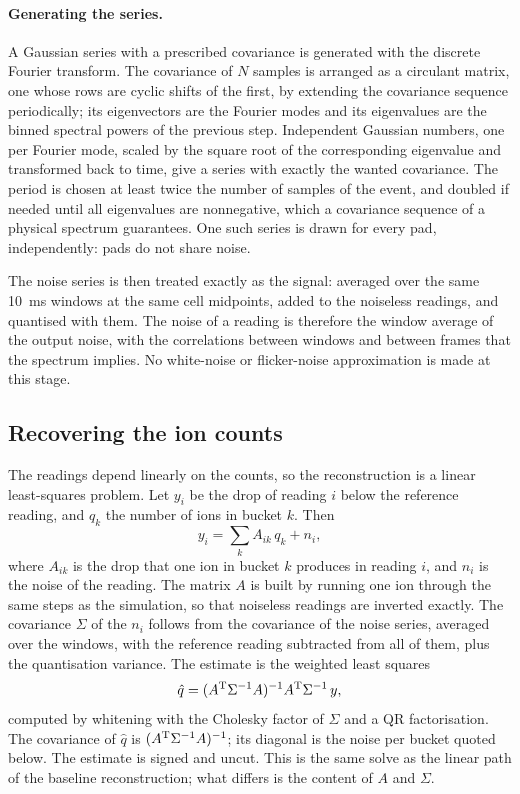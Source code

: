 \documentclass[11pt,a4paper]{article}
\begin{document}
\paragraph{Generating the series.} A Gaussian series with a prescribed
covariance is generated with the discrete Fourier transform. The covariance
of $N$ samples is arranged as a circulant matrix, one whose rows are cyclic
shifts of the first, by extending the covariance sequence periodically; its
eigenvectors are the Fourier modes and its eigenvalues are the binned
spectral powers of the previous step. Independent Gaussian numbers, one per
Fourier mode, scaled by the square root of the corresponding eigenvalue and
transformed back to time, give a series with exactly the wanted covariance.
The period is chosen at least twice the number of samples of the event, and
doubled if needed until all eigenvalues are nonnegative, which a covariance
sequence of a physical spectrum guarantees. One such series is drawn for
every pad, independently: pads do not share noise.

The noise series is then treated exactly as the signal: averaged over the
same \SI{10}{ms} windows at the same cell midpoints, added to the noiseless
readings, and quantised with them. The noise of a reading is therefore the
window average of the output noise, with the correlations between windows
and between frames that the spectrum implies. No white-noise or
flicker-noise approximation is made at this stage.

\subsection{Recovering the ion counts}
\label{sec:vh1reco}
%
The readings depend linearly on the counts, so the reconstruction is a
linear least-squares problem. Let $y_i$ be the drop of reading $i$ below the
reference reading, and $q_k$ the number of ions in bucket $k$. Then
\[
 y_i = \sum_k A_{ik}\,q_k + n_i ,
\]
where $A_{ik}$ is the drop that one ion in bucket $k$ produces in reading
$i$, and $n_i$ is the noise of the reading. The matrix $A$ is built by
running one ion through the same steps as the simulation, so that noiseless
readings are inverted exactly. The covariance $\Sigma$ of the $n_i$ follows
from the covariance of the noise series, averaged over the windows, with the
reference reading subtracted from all of them, plus the quantisation
variance. The estimate is the weighted least squares
\[
 \hat q = (A^{\rm T}\Sigma^{-1}A)^{-1}A^{\rm T}\Sigma^{-1}\,y ,
\]
computed by whitening with the Cholesky factor of $\Sigma$ and a QR
factorisation. The covariance of $\hat q$ is $(A^{\rm T}\Sigma^{-1}A)^{-1}$;
its diagonal is the noise per bucket quoted below. The estimate is signed
and uncut. This is the same solve as the linear path of the baseline
reconstruction; what differs is the content of $A$ and $\Sigma$.
\end{document}
